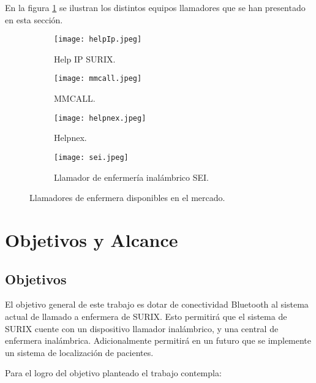 En la figura \ref{fig:sistemasDeLLamadoactuales} se ilustran los distintos equipos llamadores que se han presentado en esta sección.

\begin{figure}[!h]
	\centering
   	\begin{subfigure}[b]{0.5\textwidth}
   		\centering
      	\texttt{[image: helpIp.jpeg]}
      	\caption{Help IP SURIX.}
   	\end{subfigure}%
   	\begin{subfigure}[b]{0.5\textwidth}
   		\centering
      	\texttt{[image: mmcall.jpeg]}
      	\caption{MMCALL.}
   	\end{subfigure}%
   	\newline
   	\begin{subfigure}[b]{0.5\textwidth}
   		\centering
      	\texttt{[image: helpnex.jpeg]}
      	\caption{Helpnex.}
   	\end{subfigure}%
   	\begin{subfigure}[b]{0.5\textwidth}
   		\centering
      	\texttt{[image: sei.jpeg]}
      	\caption{Llamador de enfermería inalámbrico SEI.}
   	\end{subfigure}%
	\caption{Llamadores de enfermera disponibles en el mercado.}
	\label{fig:sistemasDeLLamadoactuales}
\end{figure}



\section{Objetivos y Alcance}

\subsection{Objetivos}

El objetivo general de este trabajo es dotar de conectividad Bluetooth al sistema actual de llamado a enfermera de SURIX. Esto permitirá que el sistema de SURIX cuente con un dispositivo llamador inalámbrico, y una central de enfermera inalámbrica. Adicionalmente permitirá en un futuro que se implemente un sistema de localización de pacientes.

Para el logro del objetivo planteado el trabajo contempla:

